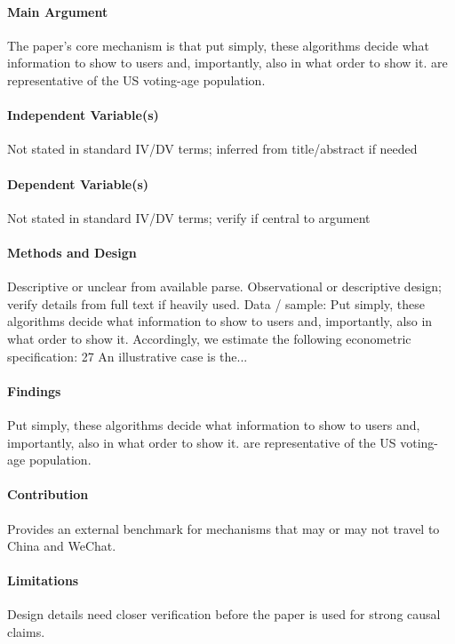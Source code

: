 \documentclass[12pt]{article}
\begin{document}
\paragraph{Main Argument} The paper's core mechanism is that put simply, these algorithms decide what information to show to users and, importantly, also in what order to show it. are representative of the US voting-age population.

\paragraph{Independent Variable(s)} Not stated in standard IV/DV terms; inferred from title/abstract if needed

\paragraph{Dependent Variable(s)} Not stated in standard IV/DV terms; verify if central to argument

\paragraph{Methods and Design} Descriptive or unclear from available parse. Observational or descriptive design; verify details from full text if heavily used. Data / sample: Put simply, these algorithms decide what information to show to users and, importantly, also in what order to show it. Accordingly, we estimate the following econometric specification: 27 An illustrative case is the...

\paragraph{Findings} Put simply, these algorithms decide what information to show to users and, importantly, also in what order to show it. are representative of the US voting-age population.

\paragraph{Contribution} Provides an external benchmark for mechanisms that may or may not travel to China and WeChat.

\paragraph{Limitations} Design details need closer verification before the paper is used for strong causal claims.
\end{document}
